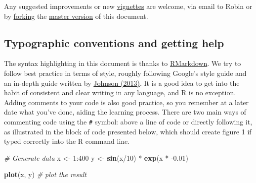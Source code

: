 \documentclass[]{article}
\newenvironment{Shaded}{}{}
\newcommand{\KeywordTok}[1]{\textcolor[rgb]{0.00,0.44,0.13}{\textbf{{#1}}}}
\newcommand{\DecValTok}[1]{\textcolor[rgb]{0.25,0.63,0.44}{{#1}}}
\newcommand{\FloatTok}[1]{\textcolor[rgb]{0.25,0.63,0.44}{{#1}}}
\newcommand{\StringTok}[1]{\textcolor[rgb]{0.25,0.44,0.63}{{#1}}}
\newcommand{\CommentTok}[1]{\textcolor[rgb]{0.38,0.63,0.69}{\textit{{#1}}}}
\newcommand{\NormalTok}[1]{{#1}}
\begin{document}
Any suggested improvements or new
\href{https://github.com/Robinlovelace/Creating-maps-in-R/tree/master/vignettes}{vignettes}
are welcome, via email to Robin or by
\href{https://help.github.com/articles/fork-a-repo}{forking} the
\href{https://github.com/Robinlovelace/Creating-maps-in-R/blob/master/intro-spatial.Rmd}{master
version} of this document.

\subsection{Typographic conventions and getting
help}\label{typographic-conventions-and-getting-help}

The syntax highlighting in this document is thanks to
\href{http://rmarkdown.rstudio.com/}{RMarkdown}. We try to follow best
practice in terms of style, roughly following Google's style guide and
an in-depth guide written by
\href{http://cran.r-project.org/web/packages/rockchalk/vignettes/Rstyle.pdf}{Johnson
(2013)}. It is a good idea to get into the habit of consistent and clear
writing in any language, and R is no exception. Adding comments to your
code is also good practice, so you remember at a later date what you've
done, aiding the learning process. There are two main ways of commenting
code using the \texttt{\#} symbol: above a line of code or directly
following it, as illustrated in the block of code presented below, which
should create figure 1 if typed correctly into the R command line.

\begin{Shaded}
\begin{Highlighting}[]
\CommentTok{# Generate data}
\NormalTok{x <-}\StringTok{ }\DecValTok{1}\NormalTok{:}\DecValTok{400}
\NormalTok{y <-}\StringTok{ }\KeywordTok{sin}\NormalTok{(x/}\DecValTok{10}\NormalTok{) *}\StringTok{ }\KeywordTok{exp}\NormalTok{(x *}\StringTok{ }\NormalTok{-}\FloatTok{0.01}\NormalTok{)}

\KeywordTok{plot}\NormalTok{(x, y)  }\CommentTok{# plot the result}
\end{Highlighting}
\end{Shaded}
\end{document}
